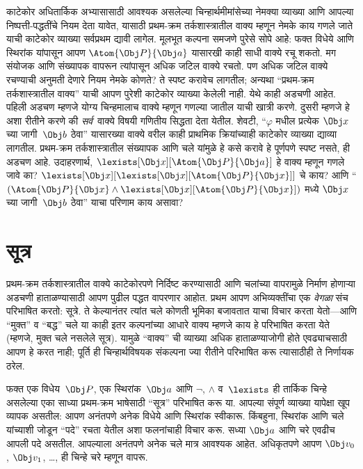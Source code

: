 काटेकोर अधितार्किक अभ्यासासाठी आवश्यक असलेल्या चिन्हार्थमीमांसेच्या
नेमक्या व्याख्या आणि आपल्या निष्पत्ती-पद्धतींचे नियम देता यावेत,
यासाठी प्रथम-क्रम तर्कशास्त्रातील वाक्य म्हणून नेमके काय गणले
जाते याची काटेकोर व्याख्या सर्वप्रथम द्यावी लागेल. मूलभूत कल्पना समजणे
पुरेसे सोपे आहे: फक्त विधेये आणि स्थिरांक यांपासून आपण
$\Atom{\Obj P}{\Obj a}$ यासारखी काही साधी वाक्ये रचू शकतो. मग
संयोजक आणि संख्यापक वापरून त्यांपासून अधिक जटिल वाक्ये रचतो. पण अधिक
जटिल वाक्ये रचण्याची अनुमती देणारे नियम नेमके कोणते? ते स्पष्ट
करावेच लागतील; अन्यथा ``प्रथम-क्रम तर्कशास्त्रातील वाक्य'' याची
आपण पुरेशी काटेकोर व्याख्या केलेली नाही. येथे काही अडचणी आहेत. पहिली
अडचण म्हणजे योग्य चिन्हमालाच वाक्ये म्हणून गणल्या जातील याची
खात्री करणे. दुसरी म्हणजे हे अशा रीतीने करणे की
\emph{सर्व}~वाक्ये विषयी गणितीय सिद्धता देता येतील. शेवटी,
``$\varphi$ मधील प्रत्येक $\Obj x$ च्या जागी~$\Obj b$ ठेवा'' यासारख्या
वाक्ये वरील काही प्राथमिक क्रियांच्याही काटेकोर व्याख्या द्याव्या
लागतील. प्रथम-क्रम तर्कशास्त्रातील संख्यापक आणि चले यांमुळे हे
कसे करावे हे पूर्णपणे स्पष्ट नसते, ही अडचण आहे. उदाहरणार्थ,
$\lexists[\Obj x][\Atom{\Obj P}{\Obj a}]$ हे वाक्य म्हणून
गणले जावे का? $\lexists[\Obj x][\lexists[\Obj x][\Atom{\Obj P}{\Obj
x}]]$ चे काय? आणि ``$(\Atom{\Obj P}{\Obj x} \land \lexists[\Obj
x][\Atom{\Obj P}{\Obj x}])$ मध्ये $\Obj x$ च्या जागी~$\Obj b$ ठेवा''
याचा परिणाम काय असावा?












\section{सूत्र}\label{fol:int:fml:sec}

प्रथम-क्रम तर्कशास्त्रातील वाक्ये काटेकोरपणे निर्दिष्ट करण्यासाठी
आणि चलांच्या वापरामुळे निर्माण होणाऱ्या अडचणी हाताळण्यासाठी
आपण पुढील पद्धत वापरणार आहोत. प्रथम आपण अभिव्यक्तींचा एक
\emph{वेगळा} संच परिभाषित करतो: सूत्रे. ते केल्यानंतर त्यांत
चले कोणती भूमिका बजावतात याचा विचार करता येतो---आणि
``मुक्त'' व ``बद्ध'' चले या काही इतर कल्पनांच्या आधारे
वाक्य म्हणजे काय हे परिभाषित करता येते (म्हणजे, मुक्त
चले नसलेले सूत्र). यामुळे ``वाक्य'' ची व्याख्या
अधिक हाताळण्याजोगी होते एवढ्याचसाठी आपण हे करत नाही; पूर्ति ही
चिन्हार्थविषयक संकल्पना ज्या रीतीने परिभाषित करू त्यासाठीही ते
निर्णायक ठरेल.

फक्त एक विधेय~$\Obj P$, एक स्थिरांक~$\Obj a$ आणि
$\lnot$, $\land$ व~$\lexists$ ही तार्किक चिन्हे असलेल्या एका साध्या
प्रथम-क्रम भाषेसाठी ``सूत्र'' परिभाषित करू या. आपल्या संपूर्ण
व्याख्या यापेक्षा खूप व्यापक असतील: आपण अनंतपणे अनेक विधेये
आणि स्थिरांक स्वीकारू. किंबहुना, स्थिरांक आणि चले
यांच्याशी जोडून ``पदे'' रचता येतील अशा फलनांचाही विचार करू.
सध्या $\Obj a$ आणि चरे एवढीच आपली पदे असतील. आपल्याला अनंतपणे अनेक
चले मात्र आवश्यक आहेत. अधिकृतपणे आपण $\Obj v_0$, $\Obj
v_1$, \dots, ही चिन्हे चरे म्हणून वापरू.

